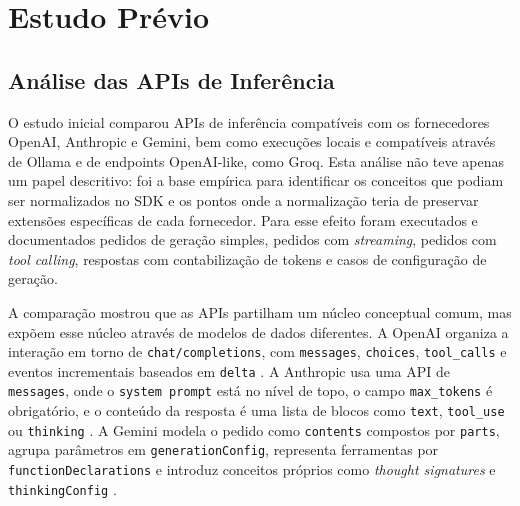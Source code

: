 \documentclass[11pt,a4paper]{report}
\begin{document}
    \chapter{Estudo Prévio}

    \section{Análise das APIs de Inferência}
    O estudo inicial comparou APIs de inferência compatíveis com os fornecedores OpenAI, Anthropic e Gemini, bem como execuções locais e compatíveis através de Ollama e de endpoints OpenAI-like, como Groq. Esta análise não teve apenas um papel descritivo: foi a base empírica para identificar os conceitos que podiam ser normalizados no SDK e os pontos onde a normalização teria de preservar extensões específicas de cada fornecedor. Para esse efeito foram executados e documentados pedidos de geração simples, pedidos com \textit{streaming}, pedidos com \textit{tool calling}, respostas com contabilização de tokens e casos de configuração de geração.

    A comparação mostrou que as APIs partilham um núcleo conceptual comum, mas expõem esse núcleo através de modelos de dados diferentes. A OpenAI organiza a interação em torno de \texttt{chat/completions}, com \texttt{messages}, \texttt{choices}, \texttt{tool\_calls} e eventos incrementais baseados em \texttt{delta} \cite{openai_api}. A Anthropic usa uma API de \texttt{messages}, onde o \texttt{system prompt} está no nível de topo, o campo \texttt{max\_tokens} é obrigatório, e o conteúdo da resposta é uma lista de blocos como \texttt{text}, \texttt{tool\_use} ou \texttt{thinking} \cite{anthropic_api}. A Gemini modela o pedido como \texttt{contents} compostos por \texttt{parts}, agrupa parâmetros em \texttt{generationConfig}, representa ferramentas por \texttt{functionDeclarations} e introduz conceitos próprios como \textit{thought signatures} e \texttt{thinkingConfig} \cite{google_gemini_api}.
\end{document}
